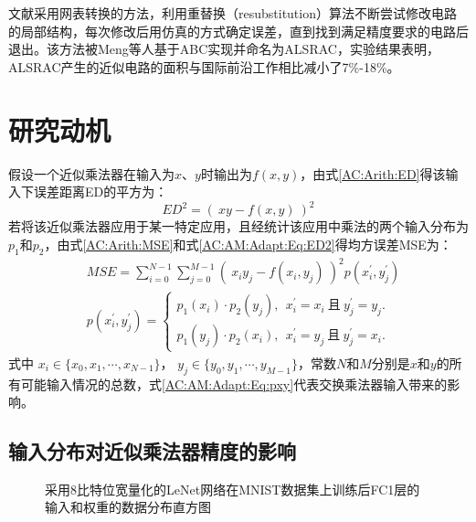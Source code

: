 文献\cite{AC:ALS:ALSRAC}采用网表转换的方法，利用重替换（resubstitution）算法\cite{LS:resub}不断尝试修改电路的局部结构，每次修改后用仿真的方式确定误差，直到找到满足精度要求的电路后退出。该方法被Meng等人基于ABC\cite{LS:ABC}实现并命名为ALSRAC，实验结果表明，ALSRAC产生的近似电路的面积与国际前沿工作相比减小了7\%-18\%。

\section{研究动机}

假设一个近似乘法器在输入为$x$、$y$时输出为$f(x,y)$，由式\eqref{AC:Arith:ED}得该输入下误差距离ED的平方为：
\begin{equation}
    ED^2 = ( \ xy - f(x,y) \ ) ^2
\label{AC:AM:Adapt:Eq:ED2}
\end{equation}
若将该近似乘法器应用于某一特定应用，且经统计该应用中乘法的两个输入分布为$p_1$和$p_2$，由式\eqref{AC:Arith:MSE}和式\eqref{AC:AM:Adapt:Eq:ED2}得均方误差MSE为：
\begin{align}
    & MSE = \sum_{i=0}^{N-1} \sum_{j=0}^{M-1} ( \ x_i y_j - f(x_i,y_j) \ ) ^2 p(x^{\prime}_i, y^{\prime}_j) \label{AC:AM:Adapt:Eq:MSE} \\
    & p(x^{\prime}_i, y^{\prime}_j) = \left\{
        \begin{aligned}
          p_1(x_i) \cdot p_2(y_j),\ \ x^{\prime}_i=x_i\ \text{且}\ y^{\prime}_j=y_j. \\
          p_1(y_j) \cdot p_2(x_i),\ \ x^{\prime}_i=y_j\ \text{且}\ y^{\prime}_j=x_i.
        \end{aligned}
        \right.      \label{AC:AM:Adapt:Eq:pxy}
\end{align}
式中 $x_i \in \{x_0, x_1, \cdots , x_{N-1}\}$， $y_j \in \{y_0, y_1, \cdots , y_{M-1}\}$，常数$N$和$M$分别是$x$和$y$的所有可能输入情况的总数，式\eqref{AC:AM:Adapt:Eq:pxy}代表交换乘法器输入带来的影响。

\subsection{输入分布对近似乘法器精度的影响}

\begin{figure}[!htb]
    \centering
    \centering
    \caption{采用8比特位宽量化的LeNet网络在MNIST数据集上训练后FC1层的输入和权重的数据分布直方图}
\label{DNN:LeNet_MNIST:Fig:FC1_distribution}
\end{figure}

